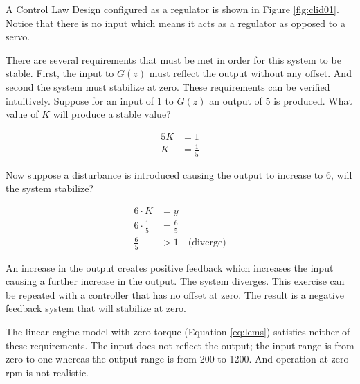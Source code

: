 \documentclass{article}
\begin{document}
A Control Law Design\autocite[Pg. 280]{franklin1998digital} configured
as a regulator is shown in Figure \ref{fig:clid01}.
Notice that there is no input which means it acts as a regulator as
opposed to a servo.

There are several requirements that must be met in order for this
system to be stable.
First, the input to $G(z)$ must reflect the output without any offset.
And second the system must stabilize at zero.
These requirements can be verified intuitively.
Suppose for an input of $1$ to $G(z)$ an output of $5$ is produced.
What value of $K$ will produce a stable value?

\begin{align*}
	5 K &= 1 \\
	K &= \frac{1}{5}
\end{align*}

Now suppose a disturbance is introduced causing the output to increase
to $6$, will the system stabilize?

\begin{align*}
	6 \cdot K &= y \\
	6 \cdot \frac{1}{5} &= \frac{6}{5} \\
	\frac{6}{5} &> 1 \quad \text{(diverge)}
\end{align*}

An increase in the output creates positive feedback which increases
the input causing a further increase in the output.
The system diverges.
This exercise can be repeated with a controller that has no offset at zero.
The result is a negative feedback system that will stabilize at zero.

The linear engine model with zero torque (Equation \ref{eq:lems})
satisfies neither of these requirements.
The input does not reflect the output; the input range is from zero to
one whereas the output range is from 200 to 1200.
And operation at zero rpm is not realistic.
\end{document}
